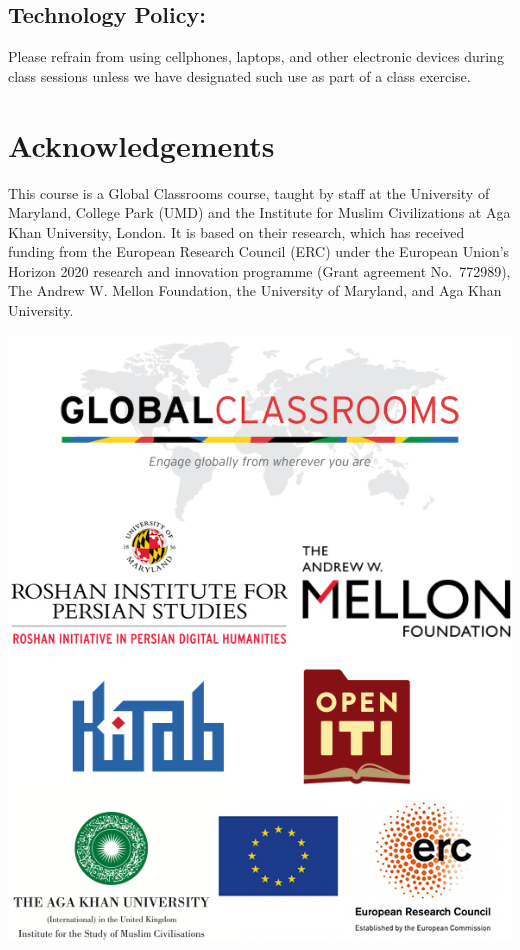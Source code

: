 \documentclass[
]{book}
\begin{document}
\hypertarget{technology-policy}{%
\subsection{Technology Policy:}\label{technology-policy}}

Please refrain from using cellphones, laptops, and other electronic devices during class sessions unless we have designated such use as part of a class exercise.

\hypertarget{acknowledgements}{%
\section{Acknowledgements}\label{acknowledgements}}

This course is a Global Classrooms course, taught by staff at the University of Maryland, College Park (UMD) and the Institute for Muslim Civilizations at Aga Khan University, London. It is based on their research, which has received funding from the European Research Council (ERC) under the European Union's Horizon 2020 research and innovation programme (Grant agreement No.~772989), The Andrew W. Mellon Foundation, the University of Maryland, and Aga Khan University.

\includegraphics{img/logos.png}
\end{document}
